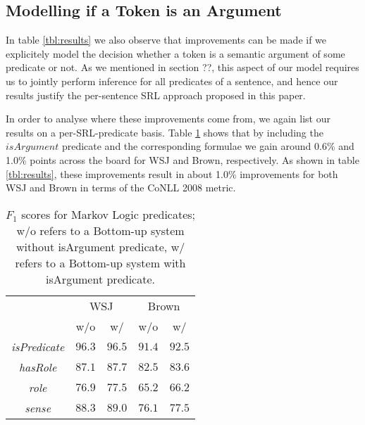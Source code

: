 
\subsection{Modelling if a Token is an Argument}
In table \ref{tbl:results} we also observe that improvements can be made if we explicitely model the decision whether a token is a semantic argument of some predicate or not. As we mentioned in section ??, this aspect of our model requires us to jointly perform inference for all predicates of a sentence, and hence our results justify the per-sentence SRL approach proposed in this paper.

In order to analyse where these improvements come from, we again list our results on a per-SRL-predicate basis. Table \ref{tbl:isArg} shows that by including the $isArgument$ predicate and the corresponding formulae we gain around 0.6\% and 1.0\% points across the board for WSJ and Brown, respectively. As shown in table \ref{tbl:results}, these improvements result in about 1.0\% improvements for both WSJ and Brown in terms of the CoNLL 2008 metric. 

\begin{table}[ht]

    \centering
    \begin{tabular}{|c|c|c|c|c|}\hline
      & \multicolumn{2}{c|}{WSJ} & \multicolumn{2}{c|}{Brown}\\
                                  & w/o     & w/     & w/o    & w/  \\\hline 
        \emph{isPredicate}        & $96.3$  & $96.5$ & $91.4$ & $92.5$\\
        \emph{hasRole}            & $87.1$  & $87.7$ & $82.5$ & $83.6$ \\
        \emph{role}               & $76.9$  & $77.5$ & $65.2$ & $66.2$ \\
        \emph{sense}              & $88.3$  & $89.0$ & $76.1$ & $77.5$ \\\hline
    \end{tabular}
    \caption{$F_1$ scores for Markov Logic predicates; w/o refers to a Bottom-up system without isArgument predicate, w/ refers to a Bottom-up system with isArgument predicate.}
    \label{tbl:isArg}
\end{table}

